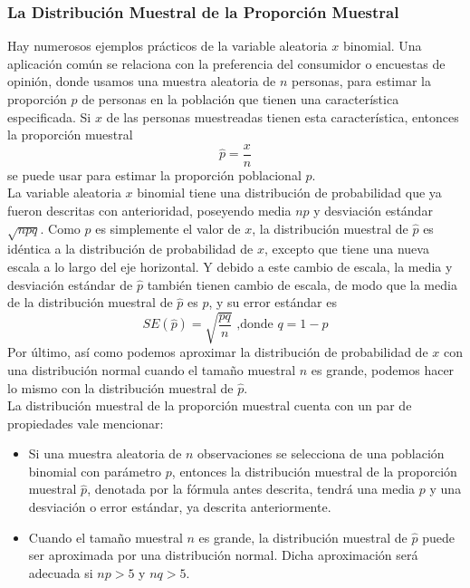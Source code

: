 \documentclass[]{article}
\begin{document}
\subsubsection{La Distribución Muestral de la Proporción Muestral}
Hay numerosos ejemplos prácticos de la variable aleatoria $x$ binomial. Una aplicación común se relaciona con la preferencia del consumidor o encuestas de opinión, donde usamos una muestra aleatoria de $n$ personas, para estimar la proporción $p$ de personas en la población que tienen una característica especificada. Si $x$ de las personas muestreadas tienen esta característica, entonces la proporción muestral
\[
\hat{p} = \frac{x}{n}
\]
se puede usar para estimar la proporción poblacional $p$.
\\ La variable aleatoria $x$ binomial tiene una distribución de probabilidad que ya fueron descritas con anterioridad, poseyendo media $np$ y desviación estándar $\sqrt{npq}$. Como $\hat{p}$ es simplemente el valor de $x$, la distribución muestral de $\hat{p}$ es idéntica a la distribución de probabilidad de $x$, excepto que tiene una nueva escala a lo largo del eje horizontal. Y debido a este cambio de escala, la media y desviación estándar de $\hat{p}$ también tienen cambio de escala, de modo que la media de la distribución muestral de $\hat{p}$ es $p$, y su error estándar es
\[
SE(\hat{p}) = \sqrt{\frac{pq}{n}} \text{ ,donde } q = 1 - p
\]
Por último, así como podemos aproximar la distribución de probabilidad de $x$ con una distribución normal cuando el tamaño muestral $n$ es grande, podemos hacer lo mismo con la distribución muestral de $\hat{p}$.
\\ La distribución muestral de la proporción muestral cuenta con un par de propiedades vale mencionar:
\begin{itemize}
	\item Si una muestra aleatoria de $n$ observaciones se selecciona de una población binomial con parámetro $p$, entonces la distribución muestral de la proporción muestral $\hat{p}$, denotada por la fórmula antes descrita, tendrá una media $p$ y una desviación o error estándar, ya descrita anteriormente.
	\item Cuando el tamaño muestral $n$ es grande, la distribución muestral de $\hat{p}$ puede ser  aproximada por una distribución normal. Dicha aproximación será adecuada si $np > 5$ y $nq > 5$.
\end{itemize}
\end{document}
